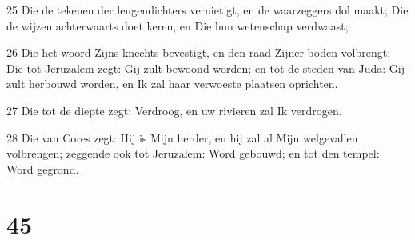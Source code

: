 \par 25 Die de tekenen der leugendichters vernietigt, en de waarzeggers dol maakt; Die de wijzen achterwaarts doet keren, en Die hun wetenschap verdwaast;
\par 26 Die het woord Zijns knechts bevestigt, en den raad Zijner boden volbrengt; Die tot Jeruzalem zegt: Gij zult bewoond worden; en tot de steden van Juda: Gij zult herbouwd worden, en Ik zal haar verwoeste plaatsen oprichten.
\par 27 Die tot de diepte zegt: Verdroog, en uw rivieren zal Ik verdrogen.
\par 28 Die van Cores zegt: Hij is Mijn herder, en hij zal al Mijn welgevallen volbrengen; zeggende ook tot Jeruzalem: Word gebouwd; en tot den tempel: Word gegrond.

\chapter{45}

